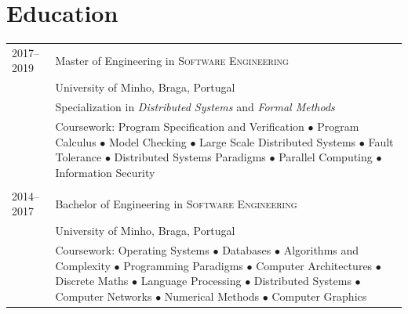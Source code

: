 \documentclass[a4paper,10pt]{article}
\begin{document}
\section{Education}
\begin{tabular}{p{2.8cm}|p{11cm}}
    \textsc{2017--2019} & Master of Engineering in \textsc{Software Engineering} \\
                     & University of Minho, Braga, Portugal \\
                     & Specialization in \textit{Distributed Systems} and \textit{Formal Methods} \\
                     & \footnotesize{Coursework: Program Specification and Verification $\bullet$ Program Calculus $\bullet$ Model Checking $\bullet$ Large Scale Distributed Systems $\bullet$ Fault Tolerance $\bullet$ Distributed Systems Paradigms $\bullet$ Parallel Computing $\bullet$ Information Security} \\

    \multicolumn{2}{c}{} \\

    \textsc{2014--2017} & Bachelor of Engineering in \textsc{Software Engineering} \\
                       & University of Minho, Braga, Portugal \\
                       & \footnotesize{Coursework: Operating Systems $\bullet$ Databases $\bullet$ Algorithms and Complexity $\bullet$ Programming
Paradigms $\bullet$ Computer Architectures $\bullet$ Discrete Maths $\bullet$ Language Processing $\bullet$ Distributed Systems $\bullet$ Computer Networks $\bullet$ Numerical Methods $\bullet$ Computer Graphics}
\end{tabular}
\end{document}
